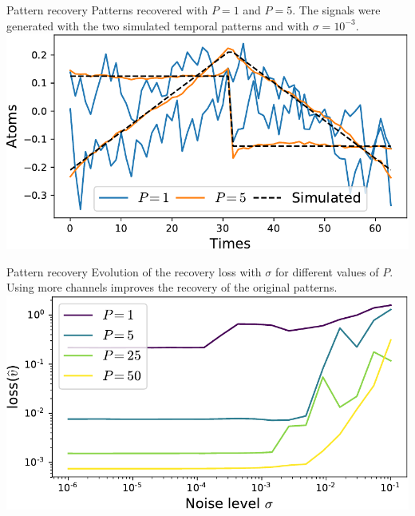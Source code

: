 \documentclass{beamer}
\def\tT{\widetilde{T}}
\begin{document}


\begin{frame}{Pattern recovery}
Patterns recovered with $P = 1$ and $P=5$. The signals were generated with the two simulated temporal patterns and with  $\sigma = 10^{-3}$. \\[1em]
\includegraphics[width=\textwidth]{1D_vs_multi_uv_hat_P5.pdf}
\end{frame}
\begin{frame}{Pattern recovery}
Evolution of the recovery loss with $\sigma$ for different values of $P$. Using more channels improves the recovery of the original patterns.\\[1em]
\includegraphics[width=\textwidth]{1D_vs_multi.pdf}
\end{frame}
\end{document}
